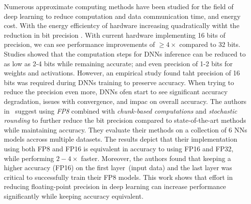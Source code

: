 Numerous approximate computing methods have been studied for the field of deep 
learning to reduce computation and data communication time, and energy cost.
With the energy efficientcy of hardware increasing quadratically witht the reduction in bit precision .
With current hardware implementing 16 bits of precision, we can see performance improvements of $\ge 4\times$ compared to 32 bits.
Studies showed that the computation steps for DNNs inference can be reduced to as low as 2-4 bits
while remaining accurate; and even precision of 1-2 bits for weights and activations.
However, an empirical study found taht precision of 16 bits was required during 
DNNs training to preserve accuracy.
When trying to reduce the precision even more, DNNs ofen start to see significant 
accuracy degradation, issues with convergence, and impac on overall accuracy.
The authors in~\cite{Wang2018-oo} suggest using \textit{FP8} combined with 
\textit{chunk-based computations} and \textit{stochastic rounding} to further reduce
the bit precision compared to state-of-the-art methods while maintaining accuracy.
They evaluate their methods on a collection of 6 NNs models accross multiple datasets.
The results depict that their implementation using both FP8 and FP16 is equivalent
in accuracy to using FP16 and FP32, while performing $2-4\times$ faster.
Moreover, the authors found that keeping a higher accuracy (FP16) on the first layer~(input data)
and the last layer was critical to successfully train their FP8 models.
This work shows that effort in reducing floating-point precision in deep learning
can increase performance significantly while keeping accuracy equivalent.

